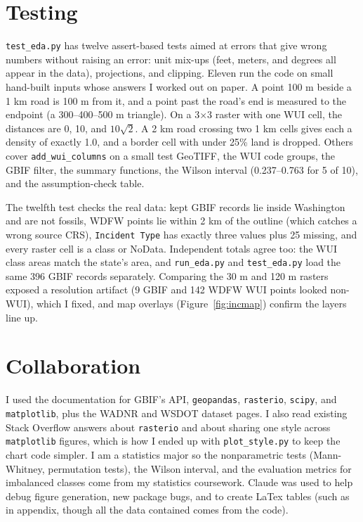 \documentclass[11pt, a4paper]{article}
\begin{document}
\section{Testing}
\texttt{test\_eda.py} has twelve assert-based tests aimed at errors that give wrong numbers without raising an error: unit mix-ups (feet, meters, and degrees all appear in the data), projections, and clipping. Eleven run the code on small hand-built inputs whose answers I worked out on paper. A point 100 m beside a 1 km road is 100 m from it, and a point past the road's end is measured to the endpoint (a 300--400--500 m triangle). On a 3$\times$3 raster with one WUI cell, the distances are 0, 10, and $10\sqrt{2}$. A 2 km road crossing two 1 km cells gives each a density of exactly 1.0, and a border cell with under 25\% land is dropped. Others cover \texttt{add\_wui\_columns} on a small test GeoTIFF, the WUI code groups, the GBIF filter, the summary functions, the Wilson interval (0.237--0.763 for 5 of 10), and the assumption-check table.

The twelfth test checks the real data: kept GBIF records lie inside Washington and are not fossils, WDFW points lie within 2 km of the outline (which catches a wrong source CRS), \texttt{Incident Type} has exactly three values plus 25 missing, and every raster cell is a class or NoData. Independent totals agree too: the WUI class areas match the state's area, and \texttt{run\_eda.py} and \texttt{test\_eda.py} load the same 396 GBIF records separately. Comparing the 30 m and 120 m rasters exposed a resolution artifact (9 GBIF and 142 WDFW WUI points looked non-WUI), which I fixed, and map overlays (Figure~\ref{fig:incmap}) confirm the layers line up.

\section{Collaboration}
I used the documentation for GBIF's API, \texttt{geopandas}, \texttt{rasterio}, \texttt{scipy}, and \texttt{matplotlib}, plus the WADNR and WSDOT dataset pages. I also read existing Stack Overflow answers about \texttt{rasterio} and about sharing one style across \texttt{matplotlib} figures, which is how I ended up with \texttt{plot\_style.py} to keep the chart code simpler. I am a statistics major so the nonparametric tests (Mann-Whitney, permutation tests), the Wilson interval, and the evaluation metrics for imbalanced classes come from my statistics coursework. Claude was used to help debug figure generation, new package bugs, and to create LaTex tables (such as in appendix, though all the data contained comes from the code).
\end{document}
